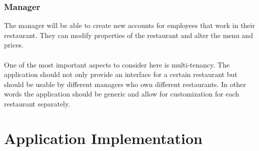 \documentclass[12pt]{article}
\begin{document}
\begin{multicols}{2}
\subsubsection{Manager}
The manager will be able to create new accounts for employees that work in their restaurant. They can modify properties of the restaurant and alter the menu and prices. 
\\\\
One of the most important aspects to consider here is multi-tenancy. The application should not only provide an interface for a certain restaurant but should be usable by different managers who own different restaurants. In other words the application should be generic and allow for customization for each restaurant separately.




\end{multicols}
\section{Application Implementation}\label{sec:implementation}
\end{document}
